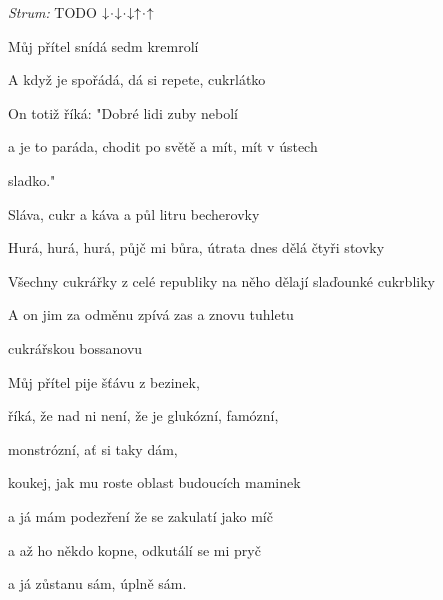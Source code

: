 \begin{song}


 \quad
\textit{Strum:} TODO $\downarrow\hspace{-0.5ex}\cdot\hspace{-0.5ex}\downarrow\hspace{-0.5ex}\cdot\hspace{-0.5ex}\downarrow\uparrow\hspace{-0.5ex}\cdot\hspace{-0.5ex}\uparrow$

\large


\large

\bigskip

Můj přítel  snídá sedm kremrolí  \par
A když je spořádá, dá si repete, cukrlátko  \par
On totiž říká:  "Dobré lidi zuby nebolí  \par
a je to paráda, chodit po světě a mít, mít v ústech \par
{}sladko."    \par

\bigskip

\begin{chorusboxwide}
 \par \smallskip
{}Sláva,  cukr a káva a půl litru becherovky \par
{}Hurá, hurá, hurá, půjč mi bůra, útrata dnes dělá čtyři stovky \par
Všechny cukrářky z celé  republiky na něho dělají slaďounké cukrbliky \par
A on jim za odměnu zpívá zas a znovu tuhletu  \par
cukrářskou bossanovu    \par
\end{chorusboxwide}

\bigskip

Můj přítel  pije šťávu z bezinek,  \par
říká, že nad ni není, že je glukózní, famózní, \par
{}monstrózní, ať si taky dám, \par
koukej, jak mu roste  oblast budoucích maminek  \par
a já mám podezření že se zakulatí jako míč \par
a až ho někdo kopne, odkutálí se mi pryč \par
a já zůstanu sám,  úplně sám.  \par


\end{song}
